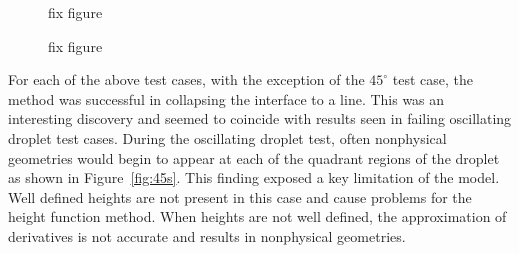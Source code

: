 \begin{figure}[htbp]
\begin{minipage}{0.3\textwidth}
		\caption{fix figure}
		\label{fig:90}
	\end{minipage}
	\begin{minipage}{0.3\textwidth}
		\caption{fix figure}
		\label{fig:45}
	\end{minipage}
\end{figure}


For each of the above test cases, with the exception of the $45^{\circ}$ test case, the method was successful in collapsing the interface to a line. This was an interesting discovery and seemed to coincide with results seen in failing oscillating droplet test cases. During the oscillating droplet test, often nonphysical geometries would begin to appear at each of the quadrant regions of the droplet as shown in Figure~\ref{fig:45s}. This finding exposed a key limitation of the model. Well defined heights are not present in this case and cause problems for the height function method. When heights are not well defined, the approximation of derivatives is not accurate and results in nonphysical geometries.  

